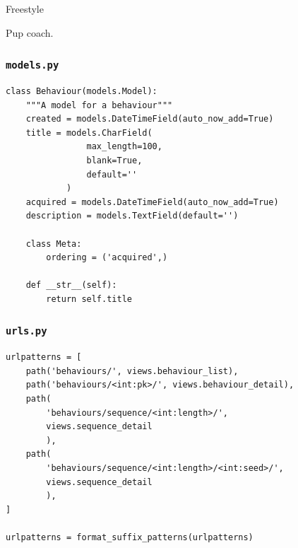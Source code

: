 \documentclass{beamer}
\begin{document}
    \begin{frame}
        \centering
        \Huge
    \end{frame}

    \begin{frame}
        \centering
        \Huge
        Freestyle
    \end{frame}

    \begin{frame}
        \centering
        \Huge
    \end{frame}

    \begin{frame}
        \centering
        \Huge
    \end{frame}

    \begin{frame}
        \centering
        \Huge
        Pup coach.
    \end{frame}

    \begin{frame}[fragile]
        \frametitle{\texttt{models.py}}
        \begin{verbatim}
class Behaviour(models.Model):
    """A model for a behaviour"""
    created = models.DateTimeField(auto_now_add=True)
    title = models.CharField(
                max_length=100, 
                blank=True, 
                default=''
            )
    acquired = models.DateTimeField(auto_now_add=True)
    description = models.TextField(default='')

    class Meta:
        ordering = ('acquired',)

    def __str__(self):
        return self.title
        \end{verbatim}
    \end{frame}

    \begin{frame}[fragile]
        \frametitle{\texttt{urls.py}}
        \small
        \begin{verbatim}
urlpatterns = [
    path('behaviours/', views.behaviour_list),
    path('behaviours/<int:pk>/', views.behaviour_detail),
    path(
        'behaviours/sequence/<int:length>/', 
        views.sequence_detail
        ),
    path(
        'behaviours/sequence/<int:length>/<int:seed>/', 
        views.sequence_detail
        ),
]

urlpatterns = format_suffix_patterns(urlpatterns)
        \end{verbatim}
    \end{frame}
\end{document}
